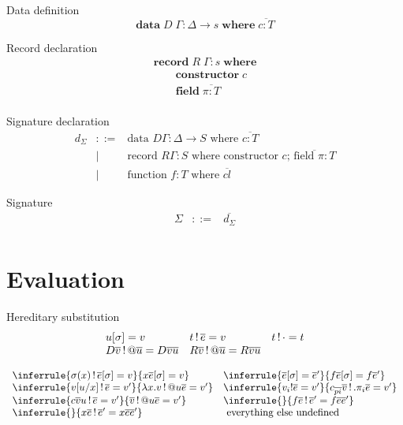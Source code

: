 \documentclass[acmlarge]{acmart}\settopmatter{}
\renewcommand{\|}{|}
\begin{document}
Data definition
\[
\textbf{data}\; D\; \Gamma : \Delta \rightarrow s \; \textbf{where}\; \overline{c : T}
\]

Record declaration
\[ \begin{array}{l}
\textbf{record}\; R\; \Gamma : s \; \textbf{where} \\
\qquad  \textbf{constructor}\; c \\
\qquad  \textbf{field}\; \overline{\pi : T} \\
\end{array}\]

Signature declaration
\[
\begin{array}{lcl}
d_\Sigma & ::= & \text{data } D\Gamma: \Delta \to S \text{ where } \overline{c : T} \\
& \| & \text{record } R\Gamma : S \text{ where constructor $c$; } \overline{\text{field }\pi : T} \\
& \| & \text{function } f : T \text{ where } \overline{cl}
\end{array}
\]


Signature
\[
\begin{array}{lcl}
\Sigma & ::= &  \overline{d_\Sigma} \\
\end{array}
\]


\section{Evaluation}
\label{sec:evaluation}

Hereditary substitution
\[
\begin{array}{lll}
u[\sigma] = v & t \,!\, \overline{e} = v & t \,!\, \cdot = t \\
D \overline{v} \,!\, @ \overline{u} = D \overline{v} \overline{u}
& R \overline{v} \,!\, @ \overline{u} = R \overline{v} \overline{u}
\end{array}
\]

\[
\begin{array}{ll}
\inferrule{\sigma(x) \bang \overline{e}[\sigma] = v}
{x \overline{e}[\sigma] = v}
&
\inferrule{\overline{e}[\sigma] = \overline{e}'}
{f \overline{e}[\sigma] = f \overline{e}'}
\\
\inferrule{ v[u/x] \bang \overline{e} = v'}
{\lambda x.v \bang @u \overline{e} = v'}
&
\inferrule{v_i ! \overline{e} = v'}
{c_{\overline{pi}} \overline{v} \bang .\pi_i \overline{e} = v'}
\\
\inferrule{c \overline{v} u \bang \overline{e} = v'}
{\overline{v} \bang @u \overline{e} = v'}
&
\inferrule{}
{f \overline{e} \bang \overline{e}' = f \overline{e} \overline{e}'}
\\
\inferrule{}
{x \overline{e} \bang \overline{e}' = x \overline{e} \overline{e}'}
&
\text{ everything else undefined }
\end{array}
\]
\end{document}
